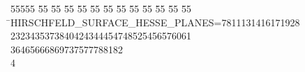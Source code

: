 %
%
\begin{tabbing}
55555 \= 55 \= 55 \= 55 \= 55 \= 55 \= 55 \= 55 \= 55 \= 55 \= 55 \= 55 \= 55 \= \>HIRSCHFELD\_SURFACE\_HESSE\_PLANES=7811131416171928\\[0pt]
2323435373840424344454748525456576061\\[0pt]
36465666869737577788182\\[0pt]
4\>\end{tabbing}
